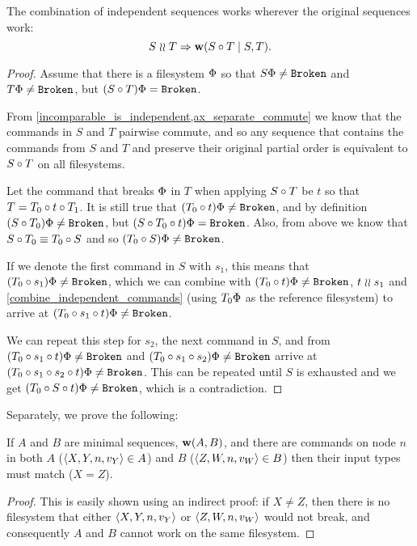 \begin{mylem}\label{combine_independent_sequences}
The combination of independent sequences works wherever the original sequences work:
\[ S\mathrel{\wr\wr} T \Rightarrow \mathbf{w}({S\circ T}\mathrel{|}{S,T}). \]
\end{mylem}
\begin{proof}
Assume that there is a filesystem $\Phi$ so that
$S\Phi\neq\mathtt{Broken}$ and $T\Phi\neq\mathtt{Broken}$, but
$(S\circ T)\Phi=\mathtt{Broken}$.

From \cref{incomparable_is_independent,ax_separate_commute} we know that
the commands in $S$ and $T$ pairwise commute, and so any sequence
that contains the commands from $S$ and $T$ and preserve their original partial order
is equivalent to $S\circ T$ on all filesystems.

Let the command that breaks $\Phi$ in $T$ when applying $S\circ T$ be $t$
so that $T=T_0\circ t\circ T_1$.
It is still true that $(T_0 \circ t)\Phi\neq\mathtt{Broken}$,
and by definition $(S\circ T_0)\Phi\neq\mathtt{Broken}$,
but $(S\circ T_0\circ t)\Phi=\mathtt{Broken}$.
Also, from above we know that $S\circ T_0\equiv T_0\circ S$
and so $(T_0 \circ S)\Phi\neq\mathtt{Broken}$.

If we denote the first command in $S$ with $s_1$,
this means that $(T_0 \circ s_1)\Phi\neq\mathtt{Broken}$,
which we can combine with $(T_0 \circ t)\Phi\neq\mathtt{Broken}$, $t\mathrel{\wr\wr} s_1$ and
\cref{combine_independent_commands}
(using $T_0\Phi$ as the reference filesystem)
to arrive at $(T_0 \circ s_1\circ t)\Phi\neq\mathtt{Broken}$.

We can repeat this step for $s_2$, the next command in $S$,
and from 
$(T_0 \circ s_1\circ t)\Phi\neq\mathtt{Broken}$
and
$(T_0 \circ s_1\circ s_2)\Phi\neq\mathtt{Broken}$
arrive at
$(T_0 \circ s_1\circ s_2\circ t)\Phi\neq\mathtt{Broken}$.
This can be repeated until $S$ is exhausted and we get
$(T_0 \circ S\circ t)\Phi\neq\mathtt{Broken}$, which is a contradiction.
\end{proof}

Separately, we prove the following:

\begin{mylem}\label{worksinputmatch}
If $A$ and $B$ are minimal sequences, $\mathbf{w}({A,B})$,
and there are commands on node $n$ in both $A$ ($\langle{X,Y,n,v_Y}\rangle\in A$) and $B$ ($\langle{Z,W,n,v_W}\rangle\in B$)
then their input types must match ($X=Z$).
\end{mylem}
\begin{proof}
This is easily shown using an indirect proof: if $X\neq Z$, then there is no filesystem that
either $\langle{X,Y,n,v_Y}\rangle$ or $\langle{Z,W,n,v_W}\rangle$ would not break, 
and consequently $A$ and $B$ cannot work on the same filesystem.
\end{proof}


